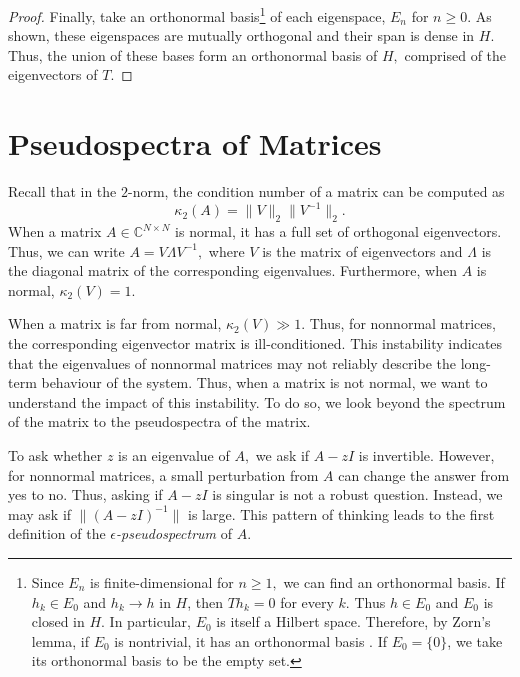 \documentclass[12pt,a4paper]{article}
\theoremstyle{boldthm}
\theoremstyle{bolddefn}
\begin{document}
\begin{proof}
    Finally, take an orthonormal basis\footnote{Since $E_n$ is finite-dimensional for $n \ge 1,$ we can find an orthonormal basis. If $h_k\in E_0$ and $h_k\to h$ in $H$, then $Th_k=0$ for every $k.$ Thus $h\in E_0$ and $E_0$ is closed in $H$. In particular, $E_0$ is itself a Hilbert space. Therefore, by Zorn's lemma, if $E_0$ is nontrivial, it has an orthonormal basis \cite[4.1-8]{krey}. If $E_0=\{0\}$, we take its orthonormal basis to be the empty set.} of each eigenspace, $E_n$ for $n \ge 0.$ As shown, these eigenspaces are mutually orthogonal and their span is dense in $H.$ Thus, the union of these bases form an orthonormal basis of $H,$ comprised of the eigenvectors of $T.$
\end{proof}


\section{Pseudospectra of Matrices}


Recall that in the $2$-norm, the condition number of a matrix can be computed as 
\begin{equation}
    \kappa_2(A) = \| V \|_2 \| V^{-1} \|_2.
\end{equation}
When a matrix $A\in\mathbb{C}^{N\times N}$ is normal, it has a full set of orthogonal eigenvectors. Thus, we can write $A = V \Lambda V^{-1},$ where $V$ is the matrix of eigenvectors and $\Lambda$ is the diagonal matrix of the corresponding eigenvalues. Furthermore, when $A$ is normal, $\kappa_2(V) = 1.$ 

When a matrix is far from normal, $\kappa_2(V) \gg 1.$ Thus, for nonnormal matrices, the corresponding eigenvector matrix is ill-conditioned. This instability indicates that the eigenvalues of nonnormal matrices may not reliably describe the long-term behaviour of the system. Thus, when a matrix is not normal, we want to understand the impact of this instability. To do so, we look beyond the spectrum of the matrix to the pseudospectra of the matrix. 

To ask whether $z$ is an eigenvalue of $A,$ we ask if $A - zI$ is invertible. However, for nonnormal matrices, a small perturbation from $A$ can change the answer from yes to no. Thus, asking if $A-zI$ is singular is not a robust question. Instead, we may ask if $\| (A-zI)^{-1} \|$ is large. This pattern of thinking leads to the first definition of the \textit{$\epsilon$-pseudospectrum} of $A.$
\end{document}
